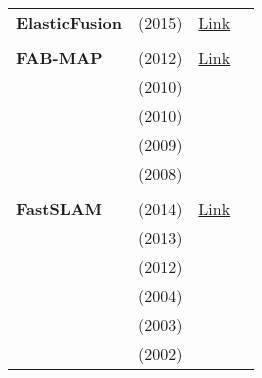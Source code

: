 \documentclass[a4paper,12pt]{scrartcl}
\begin{document}
{\begin{longtable}{l|l|l|l}
    \textbf{ElasticFusion} & \cite{Whelan2015} (2015)          & {\href{https://github.com/mp3guy/ElasticFusion}{Link}}             &                       \\
                           &                                   &                                                                    &                       \\
    \textbf{FAB-MAP}       & \cite{Glover2012} (2012)          & {\href{https://github.com/arrenglover/openfabmap}{Link}}           &                       \\
                           & \cite{Glover2010} (2010)          &                                                                    &                       \\
                           & \cite{Paul2010} (2010)            &                                                                    &                       \\
                           & \cite{Cummins2009} (2009)         &                                                                    &                       \\
                           & \cite{Cummins2008} (2008)         &                                                                    &                       \\
                           &                                   &                                                                    &                       \\
    \textbf{FastSLAM}      & \cite{Abouzahir2014} (2014)       & {\href{https://github.com/bushuhui/fastslam}{Link}}                &                       \\
                           & \cite{Naminski2013} (2013)        &                                                                    &                       \\
                           & \cite{Kurt-Yavuz2012} (2012)      &                                                                    &                       \\
                           & \cite{Thrun2004} (2004)           &                                                                    &                       \\
                           & \cite{Montemerlo2003} (2003)      &                                                                    &                       \\
                           & \cite{Montemerlo2002} (2002)      &                                                                    &                       \\

\end{longtable}}
\end{document}
